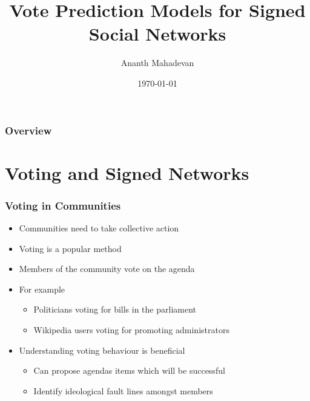 \documentclass{beamer}
\title[Signed Vote Prediction]{Vote Prediction Models for Signed Social Networks}
\author{Ananth Mahadevan}
\institute{Aalto University}
\date{\today}
\begin{document}
\begin{frame}
    \titlepage
\end{frame}

\begin{frame}
    \frametitle{Overview}
    \tableofcontents
\end{frame}


\section{Voting and Signed Networks}

\begin{frame}
    \frametitle{Voting in Communities}
    \begin{itemize}
        \item Communities need to take collective action 
        \item Voting is a popular method 
        \item Members of the community vote on the agenda
        \item For example
        \begin{itemize}
            \item Politicians voting for bills in the parliament
            \item Wikipedia users voting for promoting administrators 
        \end{itemize}
        \item Understanding voting behaviour is beneficial
        \begin{itemize}
            \item Can propose agendas items which will be successful 
            \item Identify ideological fault lines amongst members
        \end{itemize}
    \end{itemize}
    
\end{frame}
\end{document}
